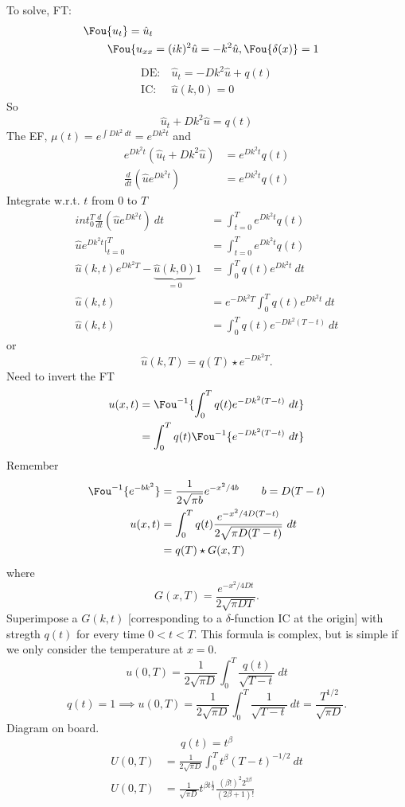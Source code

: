 \documentclass[cm]{article}
\newcommand{\uhat}{\hat{u}}
\begin{document}
To solve, FT:
\begin{align*}
\Fou\{u_t\} = \uhat_t \\
\Fou\{u_{xx} &= (ik)^2\uhat = -k^2 \uhat, \Fou\{\delta(x)\} = 1
\end{align*}
\begin{align*}
\text{DE:}&~\uhat_t = -Dk^2\uhat + q(t) \\
\text{IC:}&~ \uhat(k,0) = 0
\end{align*}
So
$$\uhat_t + Dk^2 \uhat = q(t)$$
The EF, $\mu(t) = e^{\int Dk^2~dt} = e^{Dk^2t}$ and
\begin{align*}
e^{Dk^2t}(\uhat_t + Dk^2\uhat) &=e^{Dk^2t}q(t) \\
\frac{d}{dt}\left(\uhat e^{Dk^2t}\right) &= e^{Dk^2t}q(t)
\end{align*}
Integrate w.r.t. $t$ from $0$ to $T$
\begin{align*}
int_0^T \frac{d}{dt} \left( \uhat e^{Dk^2t}\right)~dt &= \int_{t=0}^T e^{Dk^2t}
q(t) \\
\uhat e^{Dk^2t}\Big[_{t=0}^T & = \int_{t=0}^T e^{Dk^2t} q(t) \\
\uhat(k,t) e^{Dk^2 T} - \underbrace{\uhat(k,0)}_{=0}1 &= \int_0^T q(t)
e^{Dk^2t}~dt \\
\uhat(k,t) &= e^{-Dk^2T}\int_0^Tq(t)e^{Dk^2t}~dt\\
\uhat(k,t) &= \int_0^T q(t) e^{-Dk^2(T-t)}~dt
\end{align*}
or
$$\uhat(k,T) = q(T) \star e^{-Dk^2T}.$$
Need to invert the FT
\begin{align*}
u(x,t) &= \Fou^{-1} \{ \int_0^T q(t) e^{-Dk^2(T-t)}~dt\} \\
       &= \int_0^T q(t) \Fou^{-1} \{e^{-Dk^2 (T -t)}~dt\} \\
\end{align*}
Remember
\begin{align*}
\Fou^{-1} \{ e^{-bk^2} \} &= \frac{1}{2 \sqrt{\pi b}} e^{-x^2/4b} \qquad b =
D(T-t) \\
u(x,t) &= \int_0^T q(t) \frac{e^{-x^2/4D(T-t)}}{2\sqrt{\pi D(T-t)}}~dt \\
    &= q(T) \star G(x,T)
\end{align*}
where 
$$G(x,T) = \frac{e^{-x^2/4Dt}}{2\sqrt{\pi D T}}.$$
Superimpose a $G(k,t)$ [corresponding to a $\delta$-function IC at the origin]
with stregth $q(t)$ for every time $0 < t < T$. This formula is complex, but is
simple if we only consider the temperature at $x = 0$.
$$u(0,T) = \frac{1}{2\sqrt{\pi D}} \int_0^T \frac{q(t)}{\sqrt{T - t}}~dt$$
\ex
$$q(t) = 1 \implies u(0,T) = \frac{1}{2\sqrt{\pi D}} \int_0^T \frac{1}{\sqrt{T -
t}}~dt = \frac{T^{1/2}}{\sqrt{\pi D}}.$$
Diagram on board.
\xex
\ex
$$q(t) = t^{\beta}$$
\begin{align*}
U(0,T) &= \frac{1}{2\sqrt{\pi D}} \int_0^T t^{\beta} (T - t)^{-1/2} ~dt \tag{
    $\beta$eta Function} \\
U(0,T) &= \frac{1}{\sqrt{\pi D}} t^{\beta t \frac12} \frac{(\beta !)^2 2^{2
    \beta}}{(2\beta + 1)!}
\end{align*}
\xex
\end{document}
